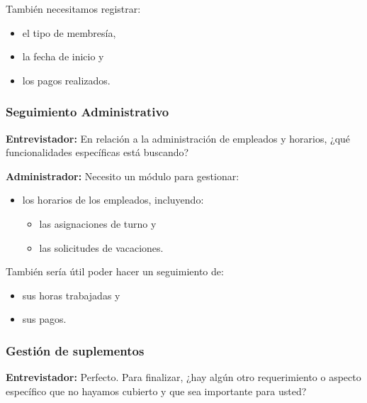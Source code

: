 \documentclass[spanish, 12pt]{article}
\providecommand{\tightlist}{\setlength{\itemsep}{0pt}
\setlength{\parskip}{0pt}}
\begin{document}
	También necesitamos registrar:

	\begin{itemize}
		\tightlist

		\item el tipo de membresía,

		\item la fecha de inicio y

		\item los pagos realizados.
	\end{itemize}

	\subsubsection{Seguimiento Administrativo}
	\label{seguimiento-administrativo}

	\textbf{Entrevistador:} En relación a la administración de empleados y
	horarios, ¿qué funcionalidades específicas está buscando?

	\textbf{Administrador:} Necesito un módulo para gestionar:

	\begin{itemize}
		\tightlist

		\item los horarios de los empleados, incluyendo:

			\begin{itemize}
				\tightlist

				\item las asignaciones de turno y

				\item las solicitudes de vacaciones.
			\end{itemize}
	\end{itemize}

	También sería útil poder hacer un seguimiento de:

	\begin{itemize}
		\tightlist

		\item sus horas trabajadas y

		\item sus pagos.
	\end{itemize}

	\subsubsection{Gestión de suplementos}
	\label{gestiuxf3n-de-suplementos}

	\textbf{Entrevistador:} Perfecto. Para finalizar, ¿hay algún otro
	requerimiento o aspecto específico que no hayamos cubierto y que sea
	importante para usted?
\end{document}
